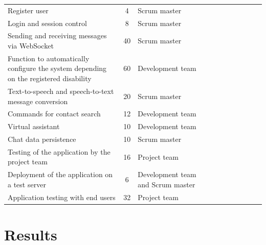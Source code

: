 \documentclass{svproc}
\begin{document}
\begin{table}[]
\begin{tabular}{cccclllllll}
		\multicolumn{1}{l}{Register user} & \multicolumn{1}{c}{4} & \multicolumn{1}{l}{Scrum master} & \multicolumn{1}{l}{} & & & & & & & \\ 
		\multicolumn{1}{l}{Login and session control} & \multicolumn{1}{c}{8} & \multicolumn{1}{l}{Scrum master} & \multicolumn{1}{l}{} & & & & & & & \\ 
		\multicolumn{1}{l}{Sending and receiving messages via WebSocket} & \multicolumn{1}{c}{40} & \multicolumn{1}{l}{Scrum master} & \multicolumn{1}{l}{} & & & & & & & \\ 
		\multicolumn{1}{l}{Function to automatically configure the system depending on the registered disability} & \multicolumn{1}{c}{60} & \multicolumn{1}{l}{Development team} & \multicolumn{1}{l}{} & & & & & & & \\ 
		\multicolumn{1}{l}{Text-to-speech and speech-to-text message conversion} & \multicolumn{1}{c}{20} & \multicolumn{1}{l}{Scrum master} & \multicolumn{1}{l}{} & & & & & & & \\ 		
		\multicolumn{1}{l}{Commands for contact search} & \multicolumn{1}{c}{12} & \multicolumn{1}{l}{Development team} & \multicolumn{1}{l}{} & & & & & & & \\ 		
		\multicolumn{1}{l}{Virtual assistant} & \multicolumn{1}{c}{10} & \multicolumn{1}{l}{Development team} & \multicolumn{1}{l}{} & & & & & & & \\ 		
		\multicolumn{1}{l}{Chat data persistence} & \multicolumn{1}{c}{10} & \multicolumn{1}{l}{Scrum master} & \multicolumn{1}{l}{} & & & & & & & \\			\multicolumn{1}{l}{Testing of the application by the project team} & \multicolumn{1}{c}{16} & \multicolumn{1}{l}{Project team} & \multicolumn{1}{l}{} & & & & & & & \\
		\multicolumn{1}{l}{Deployment of the application on a test server} & \multicolumn{1}{c}{6} & \multicolumn{1}{l}{Development team and Scrum master} & \multicolumn{1}{l}{} & & & & & & & \\
		\multicolumn{1}{l}{Application testing with end users} & \multicolumn{1}{c}{32} & \multicolumn{1}{l}{Project team} & \multicolumn{1}{l}{} & & & & & & & \\
		\hline
	\end{tabular}
	\label{tab:SprintBackLog}
\end{table}

\section{Results}
\end{document}
